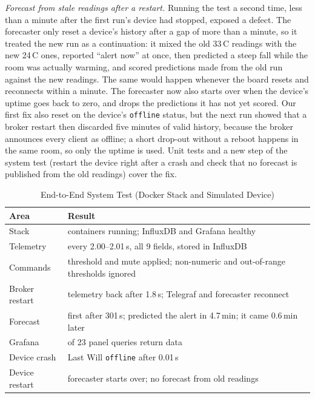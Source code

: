 \documentclass[conference]{IEEEtran}
\newcommand{\code}[1]{\texttt{\small #1}}
\begin{document}
\emph{Forecast from stale readings after a restart.} Running the test a second time, less
than a minute after the first run's device had stopped, exposed a defect. The forecaster
only reset a device's history after a gap of more than a minute, so it treated the new run as
a continuation: it mixed the old 33\,\textdegree C readings with the new 24\,\textdegree C
ones, reported ``alert now'' at once, then predicted a steep fall while the room was actually
warming, and scored predictions made from the old run against the new readings. The same
would happen whenever the board resets and reconnects within a minute. The forecaster now
also starts over when the device's uptime goes back to zero, and drops the predictions it
has not yet scored. Our first fix also reset on the device's \code{offline} status, but the
next run showed that a broker restart then discarded five minutes of valid history, because
the broker announces every client as offline; a short drop-out without a reboot happens in
the same room, so only the uptime is used. Unit tests and a new step of the system test
(restart the device right after a crash and check that no forecast is published from the
old readings) cover the fix.

\begin{table}[t]
  \caption{End-to-End System Test (Docker Stack and Simulated Device)}
  \label{tab:systest}
  \centering
  \begin{tabular}{@{}>{\raggedright\arraybackslash}p{}>{\raggedright\arraybackslash}p{}@{}}
    \toprule
    Area & Result \\
    \midrule
    Stack & 5 containers running; InfluxDB and Grafana healthy \\
    Telemetry & every 2.00--2.01\,s, all 9 fields, stored in InfluxDB \\
    Commands & threshold and mute applied; non-numeric and out-of-range thresholds ignored \\
    Broker restart & telemetry back after 1.8\,s; Telegraf and forecaster reconnect \\
    Forecast & first after 301\,s; predicted the alert in 4.7\,min; it came 0.6\,min later \\
    Grafana & 23 of 23 panel queries return data \\
    Device crash & Last Will \code{offline} after 0.01\,s \\
    Device restart & forecaster starts over; no forecast from old readings \\
    \bottomrule
  \end{tabular}
\end{table}
\end{document}
